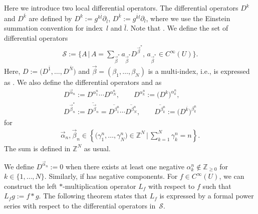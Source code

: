 \documentclass[10pt,a4paper]{amsart}
\numberwithin{equation}{section}
\begin{document}
Here we introduce two local differential operators. The differential operators
$
 D^{k}
$
and
$
 D^{\overline{k}}
$
are defined by
$
 D^{k}
 :=
 g^{k\overline{l}}
 \partial_{\overline{l}}$,
$
 D^{\overline{k}}
 :=
 g^{\overline{k}l}
 \partial_{l}$,
where we use the Einstein summation convention for index~$l$ and $\bar{l}$.
Note that .
We define the set of differential operators
\begin{align*}
 {\mathcal S}
 :=
 \bigg\{
 A \,
 \bigg|\,
 A
 =
 \sum_{\vec{\beta}^{\ast}}
 a_{\vec{\beta}^{\ast}}
 D^{\vec{\beta}^{\ast}},\,
 a_{\vec{\beta}^{\ast}}
 \in
 C^{\infty}
 (U)
 \bigg\}.
\end{align*}
Here,
$
D
:=
 \bigl(
D^{\bar{1}},
\dots,
D^{\bar{N}}
 \bigr)
$
and
$
 \vec{\beta}
 =
 (
 \beta_{1},
 \dots,
 \beta_{N}
 )
$ is a multi-index, i.e.,  is expressed as
.
We also define the differential operators
and
as
\begin{gather*}
 D^{\vec{\alpha}_{n}}
 :=
 D^{\alpha_{1}^{n}}\cdots D^{\alpha_{N}^{n}},
 \qquad
 D^{\alpha_{k}^{n}}
 :=
 \bigl(
 D^{k}
 \bigr)^{\alpha_{k}^{n}},
 \\
 D^{\vec{\beta}_{n}^{\ast}}
 :=
 \overline{
 D^{\vec{\beta}_{n}}
 }
 =
 \overline{D^{\beta_{1}^{n}}}
 \cdots
 \overline{D^{\beta_{N}^{n}}},
 \qquad
 \overline{D^{\beta_{k}^{n}}}
 :=
 \bigl(
 D^{\overline{k}}
 \bigr)^{\beta_{k}^{n}}
\end{gather*}
for
\begin{align*}
 \vec{\alpha}_{n},
 \vec{\beta}_{n}
 \in
 \left\{
 \bigl(\gamma_{1}^{n},\dots,\gamma_{N}^{n} \bigr)
 \in
 \mathbb{Z}^{N}
 \,\bigg|\,
 \sum_{k=1}^{N}
 \gamma_{k}^{n}
 =
 n
 \right\}.
\end{align*}
The sum
 is defined in $\mathbb{Z}^{N} $ as usual.

We define
$ D^{\vec{\alpha}_{n}}:=0$
when there exists at least one negative
$ \alpha_{k}^{n}
 \notin\mathbb{Z}_{\geq0}$
for
$
 k
 \in
\{1,\dots,N\}
$.
Similarly,
if  has negative components.
For
$
 f
 \in
 C^{\infty}
 (U)
$,
we can construct the left $\ast$-multiplication operator $L_{f} $ with respect to $f$
such that
$ L_{f} g := f \ast g $. The following theorem states that $L_{f}$ is expressed by a formal power series with respect to the differential operators in~$\mathcal{S}$.
\end{document}
